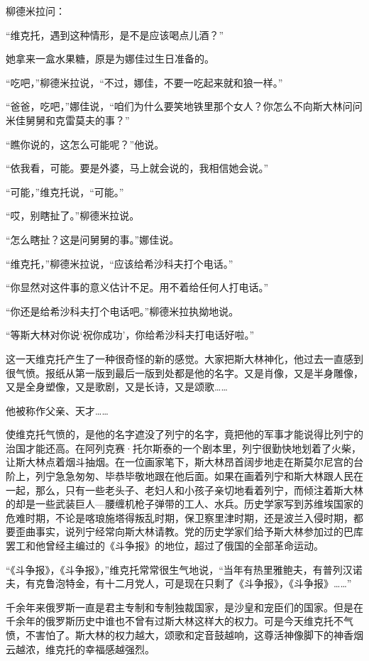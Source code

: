 柳德米拉问：

“维克托，遇到这种情形，是不是应该喝点儿酒？”

她拿来一盒水果糖，原是为娜佳过生日准备的。

“吃吧，”柳德米拉说，“不过，娜佳，不要一吃起来就和狼一样。”

“爸爸，吃吧，”娜佳说，“咱们为什么要笑地铁里那个女人？你怎么不向斯大林问问米佳舅舅和克雷莫夫的事？”

“瞧你说的，这怎么可能呢？”他说。

“依我看，可能。要是外婆，马上就会说的，我相信她会说。”

“可能，”维克托说，“可能。”

“哎，别瞎扯了。”柳德米拉说。

“怎么瞎扯？这是问舅舅的事。”娜佳说。

“维克托，”柳德米拉说，“应该给希沙科夫打个电话。”

“你显然对这件事的意义估计不足。用不着给任何人打电话。”

“你还是给希沙科夫打个电话吧。”柳德米拉执拗地说。

“等斯大林对你说‘祝你成功’，你给希沙科夫打电话好啦。”

这一天维克托产生了一种很奇怪的新的感觉。大家把斯大林神化，他过去一直感到很气愤。报纸从第一版到最后一版到处都是他的名字。又是肖像，又是半身雕像，又是全身塑像，又是歌剧，又是长诗，又是颂歌……

他被称作父亲、天才……

使维克托气愤的，是他的名字遮没了列宁的名字，竟把他的军事才能说得比列宁的治国才能还高。在阿列克赛·托尔斯泰的一个剧本里，列宁很勤快地划着了火柴，让斯大林点着烟斗抽烟。在一位画家笔下，斯大林昂首阔步地走在斯莫尔尼宫的台阶上，列宁急急匆匆、毕恭毕敬地跟在他后面。如果在画着列宁和斯大林跟人民在一起，那么，只有一些老头子、老妇人和小孩子亲切地看着列宁，而倾注着斯大林的却是一些武装巨人—腰缠机枪子弹带的工人、水兵。历史学家写到苏维埃国家的危难时期，不论是喀琅施塔得叛乱时期，保卫察里津时期，还是波兰入侵时期，都要歪曲事实，说列宁经常向斯大林请教。党的历史学家们给予斯大林参加过的巴库罢工和他曾经主编过的《斗争报》的地位，超过了俄国的全部革命运动。

“《斗争报》，《斗争报》，”维克托常常很生气地说，“当年有热里雅鲍夫，有普列汉诺夫，有克鲁泡特金，有十二月党人，可是现在只剩了《斗争报》，《斗争报》……”

千余年来俄罗斯一直是君主专制和专制独裁国家，是沙皇和宠臣们的国家。但是在千余年的俄罗斯历史中谁也不曾有过斯大林这样大的权力。可是今天维克托不气愤，不害怕了。斯大林的权力越大，颂歌和定音鼓越响，这尊活神像脚下的神香烟云越浓，维克托的幸福感越强烈。

